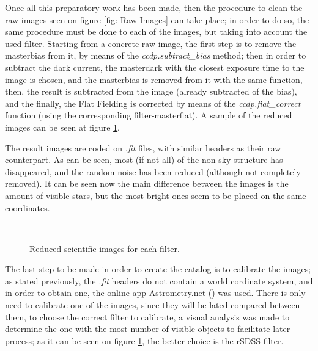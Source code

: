 \documentclass{aa}
\begin{document}
    Once all this preparatory work has been made, then the procedure to clean the raw images seen on figure \ref{fig: Raw  Images} can take place; in order to do so, the same procedure must be done to each of the images, but taking into account the used filter. Starting from a concrete raw image, the first step is to remove the masterbias from it, by means of the \textit{ccdp.subtract\_bias} method; then in order to subtract the dark current, the masterdark with the closest exposure time to the image is chosen, and the masterbias is removed from it with the same function, then, the result is subtracted from the image (already subtracted of the bias), and the finally, the Flat Fielding is corrected by means of the \textit{ccdp.flat\_correct} function (using the corresponding filter-masterflat). A sample of the reduced images can be seen at figure \ref{fig: Reduced Images}.

    The result images are coded on \textit{.fit} files, with similar headers as their raw counterpart. As can be seen, most (if not all) of the non sky structure has disappeared, and the random noise has been reduced (although not completely removed). It can be seen now the main difference between the images is the amount of visible stars, but the most bright ones seem to be placed on the same coordinates.
    
    \begin{figure}[H]
      \centering
      \quad
      \\
      \quad
      \caption{Reduced scientific images for each filter.}
      \label{fig: Reduced Images}
    \end{figure}

    The last step to be made in order to create the catalog is to calibrate the images; as stated previously, the \textit{.fit} headers do not contain a world cordinate system, and in order to obtain one, the online app Astrometry.net (\cite{Astrometry}) was used. There is only need to calibrate one of the images, since they will be lated compared between them, to choose the correct filter to calibrate, a visual analysis was made to determine the one with the most number of visible objects to facilitate later process; as it can be seen on figure \ref{fig: Reduced Images}, the better choice is the rSDSS filter.

\end{document}
